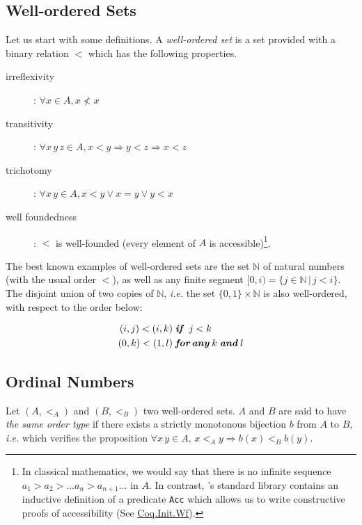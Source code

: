 \subsection{Well-ordered Sets}
Let us start with some definitions.
A  \emph{well-ordered set} is a set provided with a binary relation $<$ which has the following properties.
\begin{description}
\item[irreflexivity] : $\forall x\in A, x\not< x$
\item[transitivity] : $\forall x\,y\,z\in A, x<y \Rightarrow y<z \Rightarrow x<z$
\item[trichotomy]: $\forall x\,y\in A, x<y \vee x = y \vee y < x$
\item[well foundedness]: $<$ is well-founded (every element of $A$ is accessible)\footnote{In classical mathematics, we would say that there is no infinite sequence $a_1>a_2> \dots a_n> a_{n+1}\dots$ in $A$. In contrast, \coq's standard library contains
an inductive definition of a predicate \texttt{Acc} which allows us to write 
constructive proofs of accessibility (See \href{https://coq.inria.fr/distrib/current/stdlib/Coq.Init.Wf.html}{Coq.Init.Wf}).}.
\end{description}

The best known examples of well-ordered sets are the set $\mathbb{N}$ of natural numbers (with the usual order $<$), as well as any finite segment $[0,i)=\{j\in\mathbb{N}\,|\,j<i\}$.
The disjoint union of two copies of $\mathbb{N}$, \emph{i.e.} the set $\{0,1\}\times\mathbb{N}$ is also well-ordered,
with respect to the order below:

\begin{align*}
(i,j) < (i,k) & \;\textit{\textbf{if} }\; j < k\\
(0,k) < (1,l) & \;\textit{\textbf{for\,any}}\;k \;\textit{\textbf{and}} \; l
\end{align*}

\subsection{Ordinal Numbers}


Let $(A,<_A)$ and $(B,<_B)$ two well-ordered sets. $A$ and $B$ are said to have \emph{the same order type} if 
there exists a strictly monotonous bijection $b$ from $A$ to $B$, \emph{i.e.} which verifies the proposition
$\forall x\,y\in A,\, x <_A y \Rightarrow b(x) <_B  b(y)$.

